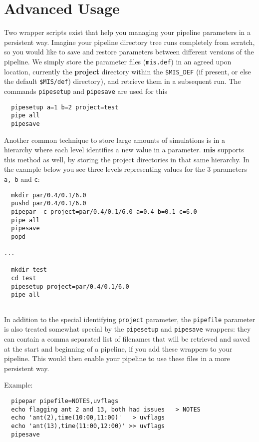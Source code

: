 \documentclass[preprint]{aastex} %
\begin{document}
\section{Advanced Usage}

Two wrapper scripts exist that help you managing your pipeline
parameters in a persistent way. Imagine your pipeline directory tree
runs completely from scratch, so you would like to save and restore
parameters between different versions of the pipeline. We simply store
the parameter files ({\tt mis.def}) in an agreed upon location,
currently the {\bf project} directory within the {\tt \$MIS\_DEF}
(if present, or else the default {\tt \$MIS/def}) directory), and
retrieve them in a subsequent run. The commands {\tt pipesetup} and
{\tt pipesave} are used for this
\footnotesize
\begin{verbatim}
  pipesetup a=1 b=2 project=test
  pipe all
  pipesave
\end{verbatim}
\normalsize   

Another common technique to store large amounts of simulations
is in a hierarchy where each level identifies a new value in a
parameter. {\bf mis} supports this method as well, by
storing the project directories in that same hierarchy. 
In the example below you see three levels representing values for the
3 parameters {\tt a, b} and {\tt c}:

\footnotesize
\begin{verbatim}
  mkdir par/0.4/0.1/6.0
  pushd par/0.4/0.1/6.0
  pipepar -c project=par/0.4/0.1/6.0 a=0.4 b=0.1 c=6.0
  pipe all
  pipesave
  popd 

...

  mkdir test
  cd test
  pipesetup project=par/0.4/0.1/6.0
  pipe all
  
\end{verbatim}
\normalsize   

In addition to the special identifying {\tt project} parameter, 
the {\tt pipefile} parameter is also treated somewhat special by the
{\tt pipesetup} and {\tt pipesave} wrappers: they can contain a comma
separated list of filenames that will be retrieved and saved at the start
and beginning of a pipeline, if you add these wrappers to your pipeline.
This would then enable your pipeline to use these files in a more persistent
way.

Example:
\footnotesize
\begin{verbatim}
  pipepar pipefile=NOTES,uvflags
  echo flagging ant 2 and 13, both had issues   > NOTES
  echo 'ant(2),time(10:00,11:00)'   > uvflags
  echo 'ant(13),time(11:00,12:00)' >> uvflags
  pipesave

\end{verbatim}
\normalsize 
\end{document}
